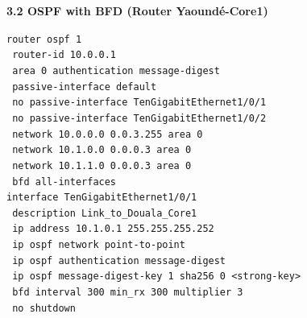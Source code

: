 \documentclass[11pt]{article}
\begin{document}
\begin{exoresolu}
\medskip
\textbf{3.2 OSPF with BFD (Router Yaoundé-Core1)}\par
\texttt{router ospf 1}\\
\texttt{\ router-id 10.0.0.1}\\
\texttt{\ area 0 authentication message-digest}\\
\texttt{\ passive-interface default}\\
\texttt{\ no passive-interface TenGigabitEthernet1/0/1}\\
\texttt{\ no passive-interface TenGigabitEthernet1/0/2}\\
\texttt{\ network 10.0.0.0 0.0.3.255 area 0}\\
\texttt{\ network 10.1.0.0 0.0.0.3 area 0}\\
\texttt{\ network 10.1.1.0 0.0.0.3 area 0}\\
\texttt{\ bfd all-interfaces}\\
\texttt{interface TenGigabitEthernet1/0/1}\\
\texttt{\ description Link\_to\_Douala\_Core1}\\
\texttt{\ ip address 10.1.0.1 255.255.255.252}\\
\texttt{\ ip ospf network point-to-point}\\
\texttt{\ ip ospf authentication message-digest}\\
\texttt{\ ip ospf message-digest-key 1 sha256 0 <strong-key>}\\
\texttt{\ bfd interval 300 min\_rx 300 multiplier 3}\\
\texttt{\ no shutdown}


\end{exoresolu}
\end{document}
